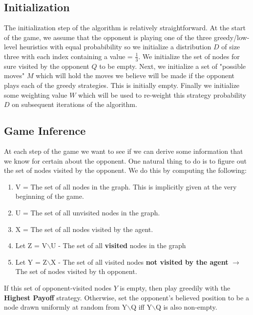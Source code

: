 \documentclass[pageno]{jpaper}
\begin{document}
\subsection{Initialization}

The initialization step of the algorithm is relatively straightforward. At the start of the game, we assume that the opponent is playing one of the three greedy/low-level heuristics with equal probabibility so we initialize a distribution $D$ of size three with each index containing a value = $\frac{1}{3}$. We initialize the set of nodes for sure visited by the opponent $Q$ to be empty. Next, we initialize a set of "possible moves" $M$ which will hold the moves we believe will be made if the opponent plays each of the greedy strategies. This is initially empty. Finally we initialize some weighting value $W$ which will be used to re-weight this strategy probability $D$ on subsequent iterations of the algorithm.

\subsection{Game Inference}

At each step of the game we want to see if we can derive some information that we know for certain about the opponent. One natural thing to do is to figure out the set of nodes visited by the opponent. We do this by computing the following:\newline

\begin{enumerate}
	\item V = The set of all nodes in the graph. This is implicitly given at the very beginning of the game.
	\item U = The set of all unvisited nodes in the graph.
	\item X = The set of all nodes visited by the agent.
	\item Let Z = V$\backslash$U - The set of all \textbf{visited} nodes in the graph
	\item Let Y = Z$\backslash$X - The set of all visited nodes \textbf{not visited by the agent} $\rightarrow$ The set of nodes visited by th opponent. 
\end{enumerate}

If this set of opponent-visited nodes $Y$ is empty, then play greedily with the \textbf{Highest Payoff} strategy. Otherwise, set the opponent's believed position to be a node drawn uniformly at random from Y$\backslash$Q iff Y$\backslash$Q is also non-empty.
\end{document}
